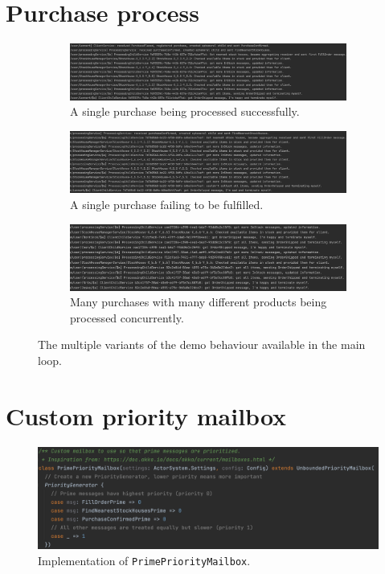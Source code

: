 \section*{Purchase process}

\begin{figure}[H]
     \centering
     \begin{subfigure}[b]{0.9\textwidth}
         \centering
         \includegraphics[width=\textwidth]{images/orderShipped.png}
         \caption{A single purchase being processed successfully.}
         \label{fig:single_shipped}
     \end{subfigure}
     \hfill
     \begin{subfigure}[b]{0.9\textwidth}
         \centering
         \includegraphics[width=\textwidth]{images/orderDelayed.png}
         \caption{A single purchase failing to be fulfilled.}
         \label{fig:single_delayed}
     \end{subfigure}
     \hfill
     \begin{subfigure}[b]{0.9\textwidth}
         \centering
         \includegraphics[width=\textwidth]{images/orderAll.png}
         \caption{Many purchases with many different products being processed concurrently.}
         \label{fig:purchase_all}
     \end{subfigure}
        \caption{The multiple variants of the demo behaviour available in the main loop.}
        \label{fig:purchase_process}
\end{figure}

\section*{Custom priority mailbox}

\begin{figure}[H]
    \centering
    \includegraphics[width=0.9\linewidth]{images/primePriority.png}
    \captionsetup{width=0.8\linewidth}
    \captionsetup{justification=centering}
    \caption{Implementation of \texttt{PrimePriorityMailbox}. }
    \label{fig:mailbox_implement}
\end{figure}